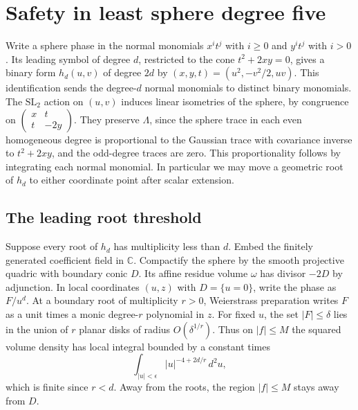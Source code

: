 \section{Safety in least sphere degree five}\label{sec:quintic}

Write a sphere phase in the normal monomials \(x^i t^j\) with \(i\ge0\)
and \(y^i t^j\) with \(i>0\). Its leading symbol of degree \(d\), restricted
to the cone \(t^2+2xy=0\), gives a binary form \(h_d(u,v)\) of degree \(2d\)
by \((x,y,t)=(u^2,-v^2/2,uv)\). This identification sends the degree-\(d\)
normal monomials to distinct binary monomials. The \(\mathrm{SL}_2\) action
on \((u,v)\) induces linear isometries of the sphere, by congruence on
\(\left(\begin{smallmatrix}x&t\\t&-2y\end{smallmatrix}\right)\).
They preserve \(\Lambda\), since the sphere trace in each even homogeneous
degree is proportional to the Gaussian trace with covariance inverse to
\(t^2+2xy\), and the odd-degree traces are zero. This proportionality
follows by integrating each normal monomial. In particular we may move a
geometric root of \(h_d\) to either coordinate point after scalar extension.

\subsection{The leading root threshold}\label{sec:leading-threshold}

Suppose every root of \(h_d\) has multiplicity less than \(d\). Embed the
finitely generated coefficient field in \(\mathbb C\). Compactify the sphere
by the smooth projective quadric with boundary conic \(D\). Its affine
residue volume \(\omega\) has divisor \(-2D\) by adjunction. In local
coordinates \((u,z)\) with \(D=\{u=0\}\), write the phase as \(F/u^d\).
At a boundary root of multiplicity \(r>0\), Weierstrass preparation writes
\(F\) as a unit times a monic degree-\(r\) polynomial in \(z\). For fixed
\(u\), the set \(|F|\le\delta\) lies in the union of \(r\) planar disks of
radius \(O(\delta^{1/r})\). Thus on \(|f|\le M\) the squared volume density
has local integral bounded by a constant times
\[
 \int_{|u|<\epsilon}|u|^{-4+2d/r}\,d^2u,
\]
which is finite since \(r<d\). Away from the roots, the region \(|f|\le M\)
stays away from \(D\).

